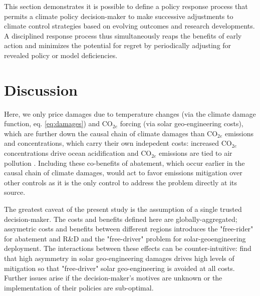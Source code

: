 \documentclass[9pt,twocolumn,twoside,lineno]{pnas-new}
\begin{document}
This section demonstrates it is possible to define a policy response process that permits a climate policy decision-maker to make successive adjustments to climate control strategies based on evolving outcomes and research developments. A disciplined response process thus simultaneously reaps the benefits of early action and minimizes the potential for regret by periodically adjusting for revealed policy or model deficiencies.

\section*{Discussion}



Here, we only price damages due to temperature changes (via the climate damage function, eq. \ref{eq:damages}) and CO$_{2e}$ forcing (via solar geo-engineering costs), which are further down the causal chain of climate damages than CO$_{2e}$ emissions and concentrations, which carry their own indepedent costs: increased CO$_{2e}$ concentrations drive ocean acidification and CO$_{2e}$ emissions are tied to air pollution \cite{silva_global_2013, burnett_global_2018}. Including these co-benefits of abatement, which occur earlier in the causal chain of climate damages, would act to favor emissions mitigation over other controls as it is the only control to address the problem directly at its source.

The greatest caveat of the present study is the assumption of a single trusted decision-maker. The costs and benefits defined here are globally-aggregated; assymetric costs and benefits between different regions introduces the "free-rider" for abatement and R\&D and the "free-driver" problem for solar-geoengineering deployment. The interactions between these effects can be counter-intuitive: \cite{moreno-cruz_mitigation_2015} find that high asymmetry in solar geo-engineering damages drives high levels of mitigation so that "free-driver" solar geo-engineering is avoided at all costs. Further issues arise if the decision-maker's motives are unknown or the implementation of their policies are sub-optimal.
\end{document}
